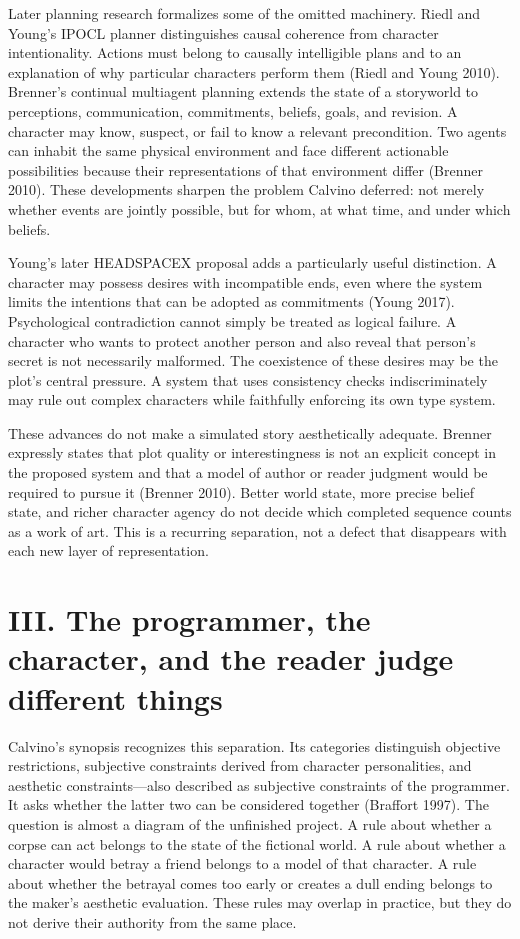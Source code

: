 \documentclass[
  11pt,
  letterpaper,
]{article}
\begin{document}
Later planning research formalizes some of the omitted machinery. Riedl
and Young's IPOCL planner distinguishes causal coherence from character
intentionality. Actions must belong to causally intelligible plans and
to an explanation of why particular characters perform them (Riedl and
Young 2010). Brenner's continual multiagent planning extends the state
of a storyworld to perceptions, communication, commitments, beliefs,
goals, and revision. A character may know, suspect, or fail to know a
relevant precondition. Two agents can inhabit the same physical
environment and face different actionable possibilities because their
representations of that environment differ (Brenner 2010). These
developments sharpen the problem Calvino deferred: not merely whether
events are jointly possible, but for whom, at what time, and under which
beliefs.

Young's later HEADSPACEX proposal adds a particularly useful
distinction. A character may possess desires with incompatible ends,
even where the system limits the intentions that can be adopted as
commitments (Young 2017). Psychological contradiction cannot simply be
treated as logical failure. A character who wants to protect another
person and also reveal that person's secret is not necessarily
malformed. The coexistence of these desires may be the plot's central
pressure. A system that uses consistency checks indiscriminately may
rule out complex characters while faithfully enforcing its own type
system.

These advances do not make a simulated story aesthetically adequate.
Brenner expressly states that plot quality or interestingness is not an
explicit concept in the proposed system and that a model of author or
reader judgment would be required to pursue it (Brenner 2010). Better
world state, more precise belief state, and richer character agency do
not decide which completed sequence counts as a work of art. This is a
recurring separation, not a defect that disappears with each new layer
of representation.

\section{III. The programmer, the character, and the reader judge
different
things}\label{iii.-the-programmer-the-character-and-the-reader-judge-different-things}

Calvino's synopsis recognizes this separation. Its categories
distinguish objective restrictions, subjective constraints derived from
character personalities, and aesthetic constraints---also described as
subjective constraints of the programmer. It asks whether the latter two
can be considered together (Braffort 1997). The question is almost a
diagram of the unfinished project. A rule about whether a corpse can act
belongs to the state of the fictional world. A rule about whether a
character would betray a friend belongs to a model of that character. A
rule about whether the betrayal comes too early or creates a dull ending
belongs to the maker's aesthetic evaluation. These rules may overlap in
practice, but they do not derive their authority from the same place.
\end{document}
